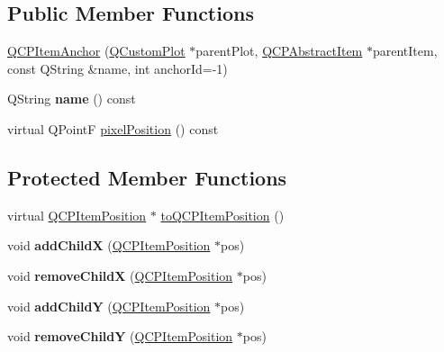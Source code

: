 \subsection*{Public Member Functions}
\begin{DoxyCompactItemize}
\item 
\hyperlink{classQCPItemAnchor_a32573023c6fa65b4496f1f995e5bfa5f}{Q\+C\+P\+Item\+Anchor} (\hyperlink{classQCustomPlot}{Q\+Custom\+Plot} $\ast$parent\+Plot, \hyperlink{classQCPAbstractItem}{Q\+C\+P\+Abstract\+Item} $\ast$parent\+Item, const Q\+String \&name, int anchor\+Id=-\/1)
\item 
\mbox{\label{classQCPItemAnchor_aad37cdf5a3f63428f61be739014e212e}} 
Q\+String {\bfseries name} () const
\item 
virtual Q\+PointF \hyperlink{classQCPItemAnchor_a06dcfb7220d26eee93eef56ae66582cb}{pixel\+Position} () const
\end{DoxyCompactItemize}
\subsection*{Protected Member Functions}
\begin{DoxyCompactItemize}
\item 
virtual \hyperlink{classQCPItemPosition}{Q\+C\+P\+Item\+Position} $\ast$ \hyperlink{classQCPItemAnchor_ac54b20120669950255a63587193dbb86}{to\+Q\+C\+P\+Item\+Position} ()
\item 
\mbox{\label{classQCPItemAnchor_aef15daa640debfb11b0aeaa2116c6fbc}} 
void {\bfseries add\+ChildX} (\hyperlink{classQCPItemPosition}{Q\+C\+P\+Item\+Position} $\ast$pos)
\item 
\mbox{\label{classQCPItemAnchor_a230b1d494cda63458e289bbe1b642599}} 
void {\bfseries remove\+ChildX} (\hyperlink{classQCPItemPosition}{Q\+C\+P\+Item\+Position} $\ast$pos)
\item 
\mbox{\label{classQCPItemAnchor_af05dc56f24536f0c7a9a0f57b58cea67}} 
void {\bfseries add\+ChildY} (\hyperlink{classQCPItemPosition}{Q\+C\+P\+Item\+Position} $\ast$pos)
\item 
\mbox{\label{classQCPItemAnchor_aa2394911d8fff3bd958b9f4f1994b64d}} 
void {\bfseries remove\+ChildY} (\hyperlink{classQCPItemPosition}{Q\+C\+P\+Item\+Position} $\ast$pos)
\end{DoxyCompactItemize}
